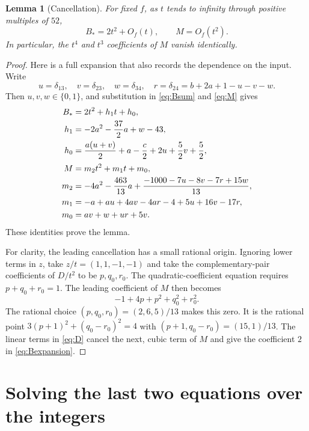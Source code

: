 \documentclass[11pt,a4paper]{article}
\newtheorem{lemma}[theorem]{Lemma}
\theoremstyle{definition}
\begin{document}
\begin{lemma}[Cancellation]\label{lem:cancellation}
For fixed $f$, as $t$ tends to infinity through positive multiples of $52$,
\begin{equation}\label{eq:cancellation}
 B_*=2t^2+O_f(t),\qquad M=O_f(t^2).
\end{equation}
In particular, the $t^4$ and $t^3$ coefficients of $M$ vanish identically.
\end{lemma}
\begin{proof}
Here is a full expansion that also records the dependence on the input.
Write
\[
 u=\delta_{13},\quad v=\delta_{23},\quad w=\delta_{34},\quad
 r=\delta_{24}=b+2a+1-u-v-w.
\]
Then $u,v,w\in\{0,1\}$, and substitution in
\eqref{eq:Bsum} and \eqref{eq:M} gives
\begin{align}
 B_*&=2t^2+h_1t+h_0,\label{eq:Bexpansion}\\
 h_1&=-2a^2-\frac{37}{2}a+w-43,\notag\\
 h_0&=\frac{a(u+v)}2+a-\frac c2+2u+\frac52v+\frac52,\notag\\[2pt]
 M&=m_2t^2+m_1t+m_0,\label{eq:Mexpansion}\\
 m_2&=-4a^2-\frac{463}{13}a+
       \frac{-1000-7u-8v-7r+15w}{13},\notag\\
 m_1&=-a+au+4av-4ar-4+5u+16v-17r,\notag\\
 m_0&=av+w+ur+5v.\notag
\end{align}
These identities prove the lemma.

For clarity, the leading cancellation has a small rational origin.
Ignoring lower terms in $z$, take $z/t=(1,1,-1,-1)$ and take the
complementary-pair coefficients of $D/t^2$ to be $p,q_0,r_0$.
The quadratic-coefficient equation requires $p+q_0+r_0=1$.
The leading coefficient of $M$ then becomes
\[
 -1+4p+p^2+q_0^2+r_0^2.
\]
The rational choice
$(p,q_0,r_0)=(2,6,5)/13$ makes this zero. It is the rational point
$3(p+1)^2+(q_0-r_0)^2=4$ with
$(p+1,q_0-r_0)=(15,1)/13$.
The linear terms in \eqref{eq:D} cancel the next, cubic term of $M$
and give the coefficient $2$ in \eqref{eq:Bexpansion}.
\end{proof}

\section{Solving the last two equations over the integers}\label{sec:lift}
\end{document}

